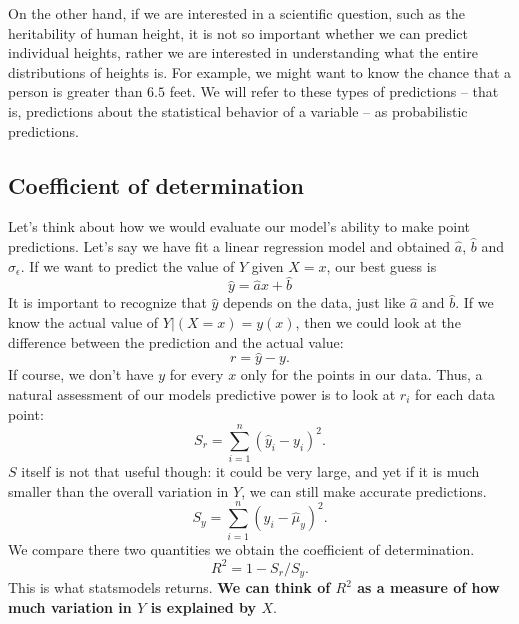 On the other hand, if we are interested in a scientific question, such as the heritability of human height, it is not so important whether we can predict individual heights, rather we are interested in understanding what the entire distributions of heights is. For example, we might want to know the chance that a person is greater than $6.5$ feet. We will refer to these types of predictions -- that is, predictions about the statistical behavior of a variable -- as {\dfn probabilistic predictions}. 

\subsection{Coefficient of determination}
Let's think about how we would evaluate our model's ability to make point predictions. Let's say we have fit a linear regression model and obtained $\hat{a}$, $\hat{b}$ and $\hat{\sigma}_{\epsilon}$. If we want to predict the value of $Y$ given $X=x$, our best guess is 
\begin{equation}
\hat{y} = \hat{a}x + \hat{b}
\end{equation}
It is important to recognize that $\hat{y}$ depends on the data, just like $\hat{a}$ and $\hat{b}$. If we know the actual value of $Y|(X=x) = y(x)$, then we could look at the difference between the prediction and the actual value:
\begin{equation}
r = \hat{y}-y.
\end{equation}
If course, we don't have $y$ for every $x$ only for the points in our data. Thus, a natural assessment of our models predictive power is to look at $r_i$ for each data point:
\begin{equation}
S_{r} =  \sum_{i=1}^n(\hat{y}_i-y_i)^2.
\end{equation}
$S$ itself is not that useful though: it could be very large, and yet if it is much smaller than the overall variation in $Y$, we can still make accurate predictions. 
\begin{equation}
S_{y} =  \sum_{i=1}^n(y_i-\hat{\mu}_y)^2.
\end{equation}
We compare there two quantities we obtain the {\dfn coefficient of determination}. 
\begin{equation}
R^2 = 1- S_r/S_y. 
\end{equation}
This is what statsmodels returns. {\bf We can think of $R^2$ as a measure of how much variation in $Y$ is explained by $X$}. 

